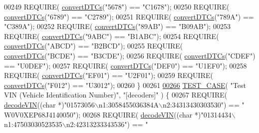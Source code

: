 \begin{DoxyCode}
{00249     REQUIRE( \hyperlink{decoders_8cpp_a4f18f411252f4c60fae4af320989c262}{convertDTCs}(\textcolor{stringliteral}{"5678"}) == \textcolor{stringliteral}{"C1678"});
00250     REQUIRE( \hyperlink{decoders_8cpp_a4f18f411252f4c60fae4af320989c262}{convertDTCs}(\textcolor{stringliteral}{"6789"}) == \textcolor{stringliteral}{"C2789"});
00251     REQUIRE( \hyperlink{decoders_8cpp_a4f18f411252f4c60fae4af320989c262}{convertDTCs}(\textcolor{stringliteral}{"789A"}) == \textcolor{stringliteral}{"C389A"});
00252     REQUIRE( \hyperlink{decoders_8cpp_a4f18f411252f4c60fae4af320989c262}{convertDTCs}(\textcolor{stringliteral}{"89AB"}) == \textcolor{stringliteral}{"B09AB"});
00253     REQUIRE( \hyperlink{decoders_8cpp_a4f18f411252f4c60fae4af320989c262}{convertDTCs}(\textcolor{stringliteral}{"9ABC"}) == \textcolor{stringliteral}{"B1ABC"});
00254     REQUIRE( \hyperlink{decoders_8cpp_a4f18f411252f4c60fae4af320989c262}{convertDTCs}(\textcolor{stringliteral}{"ABCD"}) == \textcolor{stringliteral}{"B2BCD"});
00255     REQUIRE( \hyperlink{decoders_8cpp_a4f18f411252f4c60fae4af320989c262}{convertDTCs}(\textcolor{stringliteral}{"BCDE"}) == \textcolor{stringliteral}{"B3CDE"});
00256     REQUIRE( \hyperlink{decoders_8cpp_a4f18f411252f4c60fae4af320989c262}{convertDTCs}(\textcolor{stringliteral}{"CDEF"}) == \textcolor{stringliteral}{"U0DEF"});
00257     REQUIRE( \hyperlink{decoders_8cpp_a4f18f411252f4c60fae4af320989c262}{convertDTCs}(\textcolor{stringliteral}{"DEF0"}) == \textcolor{stringliteral}{"U1EF0"});
00258     REQUIRE( \hyperlink{decoders_8cpp_a4f18f411252f4c60fae4af320989c262}{convertDTCs}(\textcolor{stringliteral}{"EF01"}) == \textcolor{stringliteral}{"U2F01"});
00259     REQUIRE( \hyperlink{decoders_8cpp_a4f18f411252f4c60fae4af320989c262}{convertDTCs}(\textcolor{stringliteral}{"F012"}) == \textcolor{stringliteral}{"U3012"});
00260 \}
00261 
\hyperlink{UnitTestCase_8cpp_a666839d6a4f130bd11ac0466c9796884}{00266} \hyperlink{UnitTestCase_8cpp_a094ceea8956a9b495823bde621ea759a}{TEST\_CASE}( \textcolor{stringliteral}{"Test VIN (Vehicle Identification Number)"}, \textcolor{stringliteral}{"[decoders]"} ) \{
00267     REQUIRE( \hyperlink{decoders_8cpp_a66754738119854c13a74265e209083e4}{decodeVIN}((\textcolor{keywordtype}{char} *)\textcolor{stringliteral}{"01573056\(\backslash\)n1:3058455036384A\(\backslash\)n2:34313430303530"}) == \textcolor{stringliteral}{"
      W0V0XEP68J4140050"});
00268     REQUIRE( \hyperlink{decoders_8cpp_a66754738119854c13a74265e209083e4}{decodeVIN}((\textcolor{keywordtype}{char} *)\textcolor{stringliteral}{"01314434\(\backslash\)n1:47503030523535\(\backslash\)n2:42313233343536"}) == \textcolor{stringliteral}{"
}}
\end{DoxyCode}
